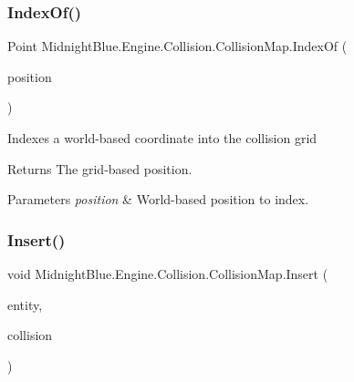 \subsubsection{\texorpdfstring{Index\+Of()}{IndexOf()}}
{\footnotesize\ttfamily Point Midnight\+Blue.\+Engine.\+Collision.\+Collision\+Map.\+Index\+Of (\begin{DoxyParamCaption}\item[{Point}]{position }\end{DoxyParamCaption})\hspace{0.3cm}{\ttfamily [inline]}}



Indexes a world-\/based coordinate into the collision grid 

\begin{DoxyReturn}{Returns}
The grid-\/based position.
\end{DoxyReturn}

\begin{DoxyParams}{Parameters}
{\em position} & World-\/based position to index.\\
\hline
\end{DoxyParams}
\hypertarget{class_midnight_blue_1_1_engine_1_1_collision_1_1_collision_map_ac5effff2c812f658296f7eb5d80b8baf}{}\label{class_midnight_blue_1_1_engine_1_1_collision_1_1_collision_map_ac5effff2c812f658296f7eb5d80b8baf} 
\subsubsection{\texorpdfstring{Insert()}{Insert()}}
{\footnotesize\ttfamily void Midnight\+Blue.\+Engine.\+Collision.\+Collision\+Map.\+Insert (\begin{DoxyParamCaption}\item[{\hyperlink{class_midnight_blue_1_1_engine_1_1_entity_component_1_1_entity}{Entity}}]{entity,  }\item[{\hyperlink{class_midnight_blue_1_1_engine_1_1_entity_component_1_1_collision_component}{Collision\+Component}}]{collision }\end{DoxyParamCaption})\hspace{0.3cm}{\ttfamily [inline]}}



